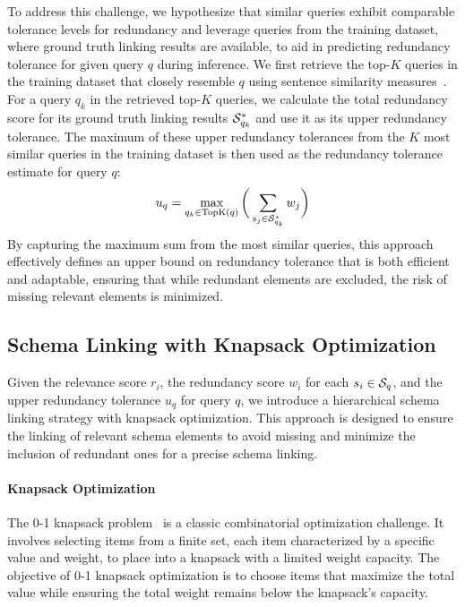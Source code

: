 To address this challenge, we hypothesize that similar queries exhibit comparable tolerance levels for redundancy and leverage queries from the training dataset, where ground truth linking results are available, to aid in predicting redundancy tolerance for given query \(q\) during inference.
We first retrieve the top-\(K\) queries in the training dataset that closely resemble \(q\) using sentence similarity measures~\citep{gao2021simcse}. For a query \(q_k\) in the retrieved top-\(K\) queries, we calculate the total redundancy score for its ground truth linking results ${\mathcal{S}}^{*}_{q_k}$  
and use it as its upper redundancy tolerance. The maximum of these upper redundancy tolerances from the \(K\) most similar queries in the training dataset is then used as the redundancy tolerance estimate for query \(q\):
\begin{equation}
u_q = \max_{q_k \in \text{TopK}(q)} \bigg( \sum_{s_j \in {\mathcal{S}}^{*}_{q_k}} w_j\bigg)
\end{equation}
By capturing the maximum sum from the most similar queries, this approach effectively defines an upper bound on redundancy tolerance that is both efficient and adaptable, ensuring that while redundant elements are excluded, the risk of missing relevant elements is minimized.




\subsection{Schema Linking with Knapsack Optimization}
Given the relevance score $r_i$, the redundancy score $w_i$ for each $s_i \in {\mathcal{S}}_q$, and the upper redundancy tolerance $u_q$ for query $q$, we introduce a hierarchical schema linking strategy with knapsack optimization. This approach is designed to ensure the linking of relevant schema elements to avoid missing and minimize the inclusion of redundant ones for a precise schema linking.

\paragraph{Knapsack Optimization}
The 0-1 knapsack problem~\citep{freville2004multidimensional} is a classic combinatorial optimization challenge. It involves selecting items from a finite set, each item characterized by a specific value and weight, to place into a knapsack with a limited weight capacity. The objective of 0-1 knapsack optimization is to choose items that maximize the total value while ensuring the total weight remains below the knapsack's capacity.

